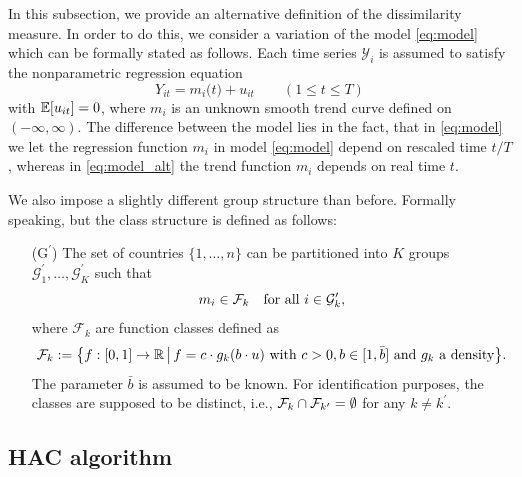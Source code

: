 \documentclass[a4paper,12pt]{article}
\numberwithin{equation}{section}
\begin{document}
In this subsection, we provide an alternative definition of the dissimilarity measure. In order to do this, we consider a variation of the model \eqref{eq:model} which can be formally stated as follows. Each time series $\mathcal{Y}_i$ is assumed to satisfy the nonparametric regression equation
\begin{equation}\label{eq:model_alt}
Y_{it} = m_i\Big(t\Big) + u_{it} \qquad (1 \le t \le T) 
\end{equation}
with $\mathbb{E}[u_{it}]= 0$, where $m_i$ is an unknown smooth trend curve defined on $(-\infty, \infty)$. The difference between the model lies in the fact, that in \eqref{eq:model} we let the regression function $m_i$ in model \eqref{eq:model} depend on rescaled time $t/T$, whereas in \eqref{eq:model_alt} the trend function $m_i$ depends on real time $t$. 

We also impose a slightly different group structure than before. Formally speaking, but the class structure is defined as follows:

\begin{enumerate}[leftmargin=0.8cm]
\item[($\text{G}^\prime$)] The set of countries $\{1,\ldots,n\}$ can be partitioned into $K$ groups $\mathcal{G}^\prime_1,\ldots,\mathcal{G}^\prime_K$ such that 
\[ m_i \in \mathcal{F}_k \quad \text{for all } i \in \mathcal{G}^\prime_k, \]
where $\mathcal{F}_k$ are function classes defined as
\[ \mathcal{F}_k := \big\{ f:[0, 1] \rightarrow \mathbb{R} \,\big|\, f = c \cdot g_k(b \cdot u) \text{ with } c > 0, b \in [1, \bar{b}] \text{ and } g_k \text{ a density} \big\}. \]
The parameter $\bar{b}$ is assumed to be known. For identification purposes, the classes are supposed to be distinct, i.e., $\mathcal{F}_k \cap \mathcal{F}_{k^\prime} = \emptyset$ for any $k \neq k^\prime$. 
\end{enumerate}


\subsection{HAC algorithm}\label{sec:alg}
\end{document}
